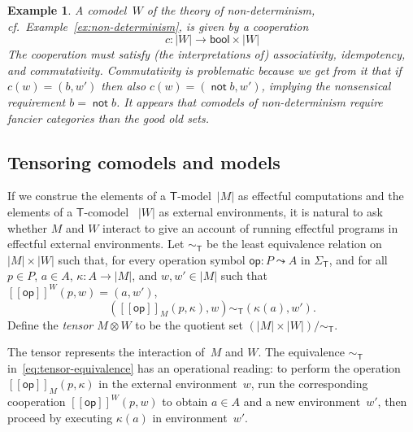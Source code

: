 \documentclass{amsart}
\newcommand{\theory}[1]{\mathsf{#1}} %
\newcommand{\signature}[1]{\Sigma_{\theory{#1}}} %
\newcommand{\carrier}[1]{|#1|} %
\newcommand{\opdecl}[3]{#1 : #2 \leadsto #3} %
\newcommand{\sem}[1]{[\![#1]\!]} %
\newcommand{\bool}{\mathsf{bool}} %
\newcommand{\tensor}[2]{#1 \otimes #2} %
\newcommand{\kode}[1]{\mathsf{#1}}
\newtheorem{example}[definition]{Example}
\begin{document}
\begin{example}
  A comodel~$W$ of the theory of non-determinism, cf.\
  Example~\ref{ex:non-determinism}, is given by a cooperation
  \begin{equation*}
    c : \carrier{W} \to \bool \times \carrier{W}
  \end{equation*}
  The cooperation must satisfy (the interpretations of) associativity,
  idempotency, and commutativity. Commutativity is problematic because we get
  from it that if $c(w) = (b, w')$ then also
  $c(w) = (\mathop{\mathsf{not}} b, w')$, implying the nonsensical requirement
  $b = \mathop{\mathsf{not}} b$. It appears that comodels of non-determinism require
  fancier categories than the good old sets.
\end{example}

\subsection{Tensoring comodels and models}
\label{sec:tens-comod-models}


If we construe the elements of a $\theory{T}$-model~$\carrier{M}$ as effectful
computations and the elements of a $\theory{T}$-comodel ~$\carrier{W}$ as
external environments, it is natural to ask whether $M$ and $W$ interact to give
an account of running effectful programs in effectful external environments.
%
Let $\sim_\theory{T}$ be the least equivalence relation
on~$\carrier{M} \times \carrier{W}$ such that, for every operation symbol
$\opdecl{\kode{op}}{P}{A}$ in $\signature{T}$, and for all $p \in P$, $a \in A$,
$\kappa : A \to \carrier{M}$, and $w, w' \in \carrier{M}$ such that
$\sem{\kode{op}}^W(p, w) = (a, w')$,
%
\begin{equation}
  \label{eq:tensor-equivalence}
  (\sem{\kode{op}}_M(p, \kappa), w) \sim_\theory{T} (\kappa(a), w').
\end{equation}
%
Define the \emph{tensor $\tensor{M}{W}$} to be the quotient set
$(\carrier{M} \times \carrier{W})/{\sim_\theory{T}}$.

The tensor represents the interaction of~$M$ and $W$. The equivalence
$\sim_\theory{T}$ in~\eqref{eq:tensor-equivalence} has an operational reading:
to perform the operation $\sem{\kode{op}}_M(p, \kappa)$ in the external
environment~$w$, run the corresponding cooperation $\sem{\kode{op}}^W(p, w)$ to
obtain $a \in A$ and a new environment~$w'$, then proceed by executing
$\kappa(a)$ in environment~$w'$.
\end{document}
